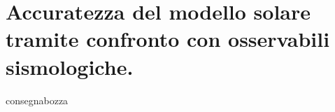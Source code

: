\documentclass[twoside,11pt,fleqn]{memoir}%
\def\versione{consegna}%
\def\bozza{bozza}
\begin{document}


\cleartorecto
\part{Accuratezza del modello solare tramite confronto con osservabili sismologiche.}



{\let\clearpage\relax\let\cleardoublepage\relax
\backmatter
}

%
{\let\clearpage\relax\let\cleardoublepage\relax
\printbibliography
}

\ifx\versione\bozza
\woc
\erratac
\fi
\end{document}
